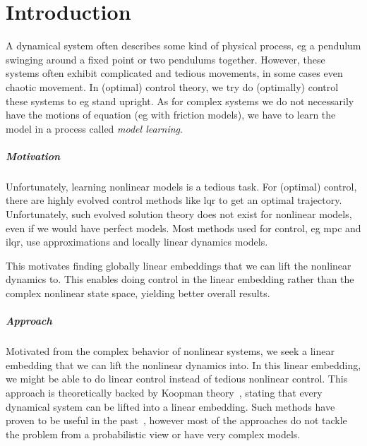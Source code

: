 \chapter{Introduction}
\label{c:introduction}



A dynamical system often describes some kind of physical process, \ac{eg} a pendulum swinging around a fixed point or two pendulums together. However, these systems often exhibit complicated and tedious movements, in some cases even chaotic movement. In (optimal) control theory, we try do (optimally) control these systems to \ac{eg} stand upright. As for complex systems we do not necessarily have the motions of equation (\ac{eg} with friction models), we have to learn the model in a process called \emph{model learning}.

\paragraph{Motivation}
	Unfortunately, learning nonlinear models is a tedious task. For (optimal) control, there are highly evolved control methods like \ac{lqr} to get an optimal trajectory. Unfortunately, such evolved solution theory does not exist for nonlinear models, even if we would have perfect models. Most methods used for control, \ac{eg} \ac{mpc} and \ac{ilqr}, use approximations and locally linear dynamics models.

	This motivates finding globally linear embeddings that we can lift the nonlinear dynamics to. This enables doing control in the linear embedding rather than the complex nonlinear state space, yielding better overall results.

\paragraph{Approach}
	Motivated from the complex behavior of nonlinear systems, we seek a linear embedding that we can lift the nonlinear dynamics into. In this linear embedding, we might be able to do linear control instead of tedious nonlinear control. This approach is theoretically backed by Koopman theory~\cite{koopmanHamiltonianSystemsTransformation1931}, stating that every dynamical system can be lifted into a linear embedding. Such methods have proven to be useful in the past~\cite{kaiserDatadrivenDiscoveryKoopman2020,hanDeepLearningKoopman2020,mortonDeepVariationalKoopman2019a}, however most of the approaches do not tackle the problem from a probabilistic view or have very complex models.

